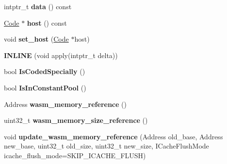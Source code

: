 \begin{DoxyCompactItemize}
\item 
intptr\+\_\+t {\bfseries data} () const \hypertarget{classv8_1_1internal_1_1_reloc_info_a3cc9a6deed9b6d5cdc2acad8e1e2ecf7}{}\label{classv8_1_1internal_1_1_reloc_info_a3cc9a6deed9b6d5cdc2acad8e1e2ecf7}

\item 
\hyperlink{classv8_1_1internal_1_1_code}{Code} $\ast$ {\bfseries host} () const \hypertarget{classv8_1_1internal_1_1_reloc_info_aebdb6182117b663964fec7b2ac117c61}{}\label{classv8_1_1internal_1_1_reloc_info_aebdb6182117b663964fec7b2ac117c61}

\item 
void {\bfseries set\+\_\+host} (\hyperlink{classv8_1_1internal_1_1_code}{Code} $\ast$host)\hypertarget{classv8_1_1internal_1_1_reloc_info_af75c22e2b412d6c9cf663a65c928ea52}{}\label{classv8_1_1internal_1_1_reloc_info_af75c22e2b412d6c9cf663a65c928ea52}

\item 
{\bfseries I\+N\+L\+I\+NE} (void apply(intptr\+\_\+t delta))\hypertarget{classv8_1_1internal_1_1_reloc_info_a1ce3bf2c1e5325107e1c0c2d0257f76e}{}\label{classv8_1_1internal_1_1_reloc_info_a1ce3bf2c1e5325107e1c0c2d0257f76e}

\item 
bool {\bfseries Is\+Coded\+Specially} ()\hypertarget{classv8_1_1internal_1_1_reloc_info_a8f33d5c22a0e3cbe30e5ff67843dea3f}{}\label{classv8_1_1internal_1_1_reloc_info_a8f33d5c22a0e3cbe30e5ff67843dea3f}

\item 
bool {\bfseries Is\+In\+Constant\+Pool} ()\hypertarget{classv8_1_1internal_1_1_reloc_info_a74178a98b5efdd971a4f647281b6296e}{}\label{classv8_1_1internal_1_1_reloc_info_a74178a98b5efdd971a4f647281b6296e}

\item 
Address {\bfseries wasm\+\_\+memory\+\_\+reference} ()\hypertarget{classv8_1_1internal_1_1_reloc_info_a380e90819b40c20b5e6aa49519d4849b}{}\label{classv8_1_1internal_1_1_reloc_info_a380e90819b40c20b5e6aa49519d4849b}

\item 
uint32\+\_\+t {\bfseries wasm\+\_\+memory\+\_\+size\+\_\+reference} ()\hypertarget{classv8_1_1internal_1_1_reloc_info_af6fa4bba01a70d0486ca81e20d793cc1}{}\label{classv8_1_1internal_1_1_reloc_info_af6fa4bba01a70d0486ca81e20d793cc1}

\item 
void {\bfseries update\+\_\+wasm\+\_\+memory\+\_\+reference} (Address old\+\_\+base, Address new\+\_\+base, uint32\+\_\+t old\+\_\+size, uint32\+\_\+t new\+\_\+size, I\+Cache\+Flush\+Mode icache\+\_\+flush\+\_\+mode=S\+K\+I\+P\+\_\+\+I\+C\+A\+C\+H\+E\+\_\+\+F\+L\+U\+SH)\hypertarget{classv8_1_1internal_1_1_reloc_info_a0b3e4d46257909485938788d7f2470dd}{}\label{classv8_1_1internal_1_1_reloc_info_a0b3e4d46257909485938788d7f2470dd}


\end{DoxyCompactItemize}
